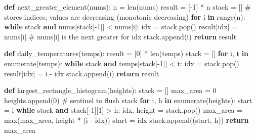 \documentclass[11pt]{article}
\newenvironment{Shaded}{\begin{snugshade}}{\end{snugshade}}
\newcommand{\BuiltInTok}[1]{\textcolor[rgb]{0.50,0.55,0.55}{#1}}
\newcommand{\CommentTok}[1]{\textcolor[rgb]{0.48,0.49,0.49}{#1}}
\newcommand{\ControlFlowTok}[1]{\textcolor[rgb]{0.99,0.74,0.29}{\textbf{#1}}}
\newcommand{\DecValTok}[1]{\textcolor[rgb]{0.96,0.45,0.00}{#1}}
\newcommand{\KeywordTok}[1]{\textcolor[rgb]{0.81,0.81,0.76}{\textbf{#1}}}
\newcommand{\NormalTok}[1]{\textcolor[rgb]{0.81,0.81,0.76}{#1}}
\newcommand{\OperatorTok}[1]{\textcolor[rgb]{0.81,0.81,0.76}{#1}}
\begin{document}
\begin{Shaded}
\begin{Highlighting}[]
\KeywordTok{def}\NormalTok{ next\_greater\_element(nums):}
\NormalTok{    n }\OperatorTok{=} \BuiltInTok{len}\NormalTok{(nums)}
\NormalTok{    result }\OperatorTok{=}\NormalTok{ [}\OperatorTok{{-}}\DecValTok{1}\NormalTok{] }\OperatorTok{*}\NormalTok{ n}
\NormalTok{    stack }\OperatorTok{=}\NormalTok{ []   }\CommentTok{\# stores indices; values are decreasing (monotonic decreasing)}
    \ControlFlowTok{for}\NormalTok{ i }\KeywordTok{in} \BuiltInTok{range}\NormalTok{(n):}
        \ControlFlowTok{while}\NormalTok{ stack }\KeywordTok{and}\NormalTok{ nums[stack[}\OperatorTok{{-}}\DecValTok{1}\NormalTok{]] }\OperatorTok{\textless{}}\NormalTok{ nums[i]:}
\NormalTok{            idx }\OperatorTok{=}\NormalTok{ stack.pop()}
\NormalTok{            result[idx] }\OperatorTok{=}\NormalTok{ nums[i]           }\CommentTok{\# nums[i] is the next greater for idx}
\NormalTok{        stack.append(i)}
    \ControlFlowTok{return}\NormalTok{ result}

\KeywordTok{def}\NormalTok{ daily\_temperatures(temps):}
\NormalTok{    result }\OperatorTok{=}\NormalTok{ [}\DecValTok{0}\NormalTok{] }\OperatorTok{*} \BuiltInTok{len}\NormalTok{(temps)}
\NormalTok{    stack }\OperatorTok{=}\NormalTok{ []}
    \ControlFlowTok{for}\NormalTok{ i, t }\KeywordTok{in} \BuiltInTok{enumerate}\NormalTok{(temps):}
        \ControlFlowTok{while}\NormalTok{ stack }\KeywordTok{and}\NormalTok{ temps[stack[}\OperatorTok{{-}}\DecValTok{1}\NormalTok{]] }\OperatorTok{\textless{}}\NormalTok{ t:}
\NormalTok{            idx }\OperatorTok{=}\NormalTok{ stack.pop()}
\NormalTok{            result[idx] }\OperatorTok{=}\NormalTok{ i }\OperatorTok{{-}}\NormalTok{ idx}
\NormalTok{        stack.append(i)}
    \ControlFlowTok{return}\NormalTok{ result}

\KeywordTok{def}\NormalTok{ largest\_rectangle\_histogram(heights):}
\NormalTok{    stack }\OperatorTok{=}\NormalTok{ []}
\NormalTok{    max\_area }\OperatorTok{=} \DecValTok{0}
\NormalTok{    heights.append(}\DecValTok{0}\NormalTok{)           }\CommentTok{\# sentinel to flush stack}
    \ControlFlowTok{for}\NormalTok{ i, h }\KeywordTok{in} \BuiltInTok{enumerate}\NormalTok{(heights):}
\NormalTok{        start }\OperatorTok{=}\NormalTok{ i}
        \ControlFlowTok{while}\NormalTok{ stack }\KeywordTok{and}\NormalTok{ stack[}\OperatorTok{{-}}\DecValTok{1}\NormalTok{][}\DecValTok{1}\NormalTok{] }\OperatorTok{\textgreater{}}\NormalTok{ h:}
\NormalTok{            idx, height }\OperatorTok{=}\NormalTok{ stack.pop()}
\NormalTok{            max\_area }\OperatorTok{=} \BuiltInTok{max}\NormalTok{(max\_area, height }\OperatorTok{*}\NormalTok{ (i }\OperatorTok{{-}}\NormalTok{ idx))}
\NormalTok{            start }\OperatorTok{=}\NormalTok{ idx}
\NormalTok{        stack.append((start, h))}
    \ControlFlowTok{return}\NormalTok{ max\_area}
\end{Highlighting}
\end{Shaded}
\end{document}
